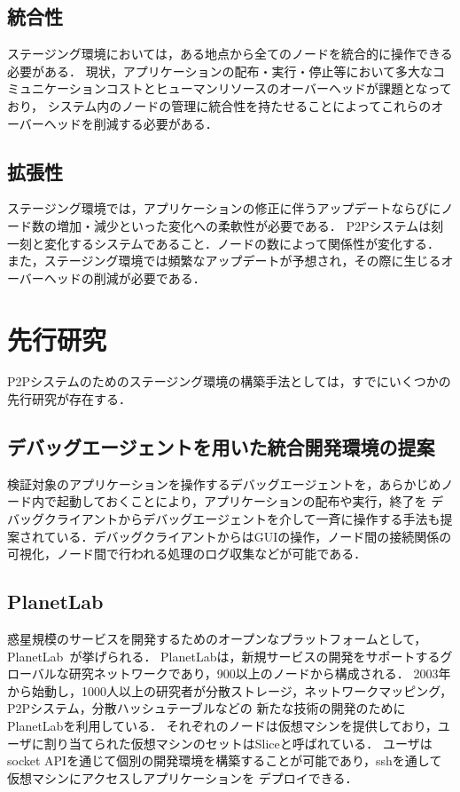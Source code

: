\subsection{統合性}
\label{issue:requirements2}
ステージング環境においては，ある地点から全てのノードを統合的に操作できる必要がある．
現状，アプリケーションの配布・実行・停止等において多大なコミュニケーションコストとヒューマンリソースのオーバーヘッドが課題となっており，
システム内のノードの管理に統合性を持たせることによってこれらのオーバーヘッドを削減する必要がある．

\subsection{拡張性}
\label{issue:requirements3}
ステージング環境では，アプリケーションの修正に伴うアップデートならびにノード数の増加・減少といった変化への柔軟性が必要である．
P2Pシステムは刻一刻と変化するシステムであること．ノードの数によって関係性が変化する．
また，ステージング環境では頻繁なアップデートが予想され，その際に生じるオーバーヘッドの削減が必要である．

\section{先行研究}
\label{issue:previous-research}
P2Pシステムのためのステージング環境の構築手法としては，すでにいくつかの先行研究が存在する．

\subsection{デバッグエージェントを用いた統合開発環境の提案}
検証対象のアプリケーションを操作するデバッグエージェントを，あらかじめノード内で起動しておくことにより，アプリケーションの配布や実行，終了を
デバッグクライアントからデバッグエージェントを介して一斉に操作する手法も提案されている．デバッグクライアントからはGUIの操作，ノード間の接続関係の
可視化，ノード間で行われる処理のログ収集などが可能である．

\subsection{PlanetLab}
\label{consideration:related-works:planetlab}

惑星規模のサービスを開発するためのオープンなプラットフォームとして，PlanetLab~\cite{PlanetLab}が挙げられる．
PlanetLabは，新規サービスの開発をサポートするグローバルな研究ネットワークであり，900以上のノードから構成される．
2003年から始動し，1000人以上の研究者が分散ストレージ，ネットワークマッピング，P2Pシステム，分散ハッシュテーブルなどの
新たな技術の開発のためにPlanetLabを利用している．
それぞれのノードは仮想マシンを提供しており，ユーザに割り当てられた仮想マシンのセットはSliceと呼ばれている．
ユーザはsocket APIを通じて個別の開発環境を構築することが可能であり，sshを通して仮想マシンにアクセスしアプリケーションを
デプロイできる．

